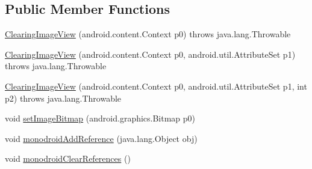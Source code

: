 \subsection*{Public Member Functions}
\begin{DoxyCompactItemize}
\item 
\hyperlink{classsignaturepad_1_1_clearing_image_view_ad9fa6939ec7674f4d5405799c7c16430}{Clearing\+Image\+View} (android.\+content.\+Context p0)  throws java.\+lang.\+Throwable 	
\item 
\hyperlink{classsignaturepad_1_1_clearing_image_view_a2fffeb6f74c097164fd552694ef43afa}{Clearing\+Image\+View} (android.\+content.\+Context p0, android.\+util.\+Attribute\+Set p1)  throws java.\+lang.\+Throwable 	
\item 
\hyperlink{classsignaturepad_1_1_clearing_image_view_a31b6f13ff4aa80d49b320af3bc873213}{Clearing\+Image\+View} (android.\+content.\+Context p0, android.\+util.\+Attribute\+Set p1, int p2)  throws java.\+lang.\+Throwable 	
\item 
void \hyperlink{classsignaturepad_1_1_clearing_image_view_a4e4f7490c50af97a57ac1ce93cfd9f95}{set\+Image\+Bitmap} (android.\+graphics.\+Bitmap p0)
\item 
void \hyperlink{classsignaturepad_1_1_clearing_image_view_a01af4280ae864dc6d70a7050ca833cb9}{monodroid\+Add\+Reference} (java.\+lang.\+Object obj)
\item 
void \hyperlink{classsignaturepad_1_1_clearing_image_view_a268f57988cd04a7b35e265f52729a523}{monodroid\+Clear\+References} ()
\end{DoxyCompactItemize}


